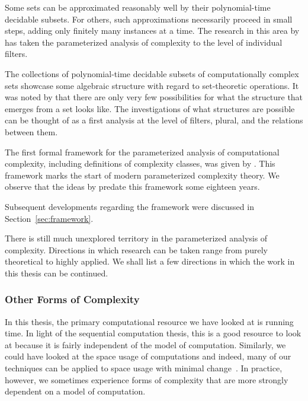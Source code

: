 \begin{description}
  Some sets can be approximated reasonably well by their polynomial-time decidable subsets.
  For others, such approximations necessarily proceed in small steps, adding only finitely many instances at a time.
  The research in this area by \citeauthor{orponen1985polynomial} has taken the parameterized analysis of complexity to the level of individual filters.
\item[\yeartextcite{orponen1986classification}]
  The collections of polynomial-time decidable subsets of computationally complex sets showcase some algebraic structure with regard to set-theoretic operations.
  It was noted by \citeauthor{orponen1986classification} that there are only very few possibilities for what the structure that emerges from a set looks like.
  The investigations of what structures are possible can be thought of as a first analysis at the level of filters, plural, and the relations between them.
\item[\yeartextcite{downey1992fixed}]
  The first formal framework for the parameterized analysis of computational complexity, including definitions of complexity classes, was given by \citeauthor{downey1992fixed}.
  This framework marks the start of modern parameterized complexity theory.
  We observe that the ideas by \citeauthor{flajolet1974sets} predate this framework some eighteen years.
\end{description}
Subsequent developments regarding the framework were discussed in Section~\ref{sec:framework}.


\label{sec:conclusion:future}%

There is still much unexplored territory in the parameterized analysis of complexity.
Directions in which research can be taken range from purely theoretical to highly applied.
We shall list a few directions in which the work in this thesis can be continued.

\subsubsection{Other Forms of Complexity}
In this thesis, the primary computational resource we have looked at is running time.
In light of the sequential computation thesis, this is a good resource to look at because it is fairly independent of the model of computation.
Similarly, we could have looked at the space usage of computations and indeed, many of our techniques can be applied to space usage with minimal change~\parencite{witteveen2015structural}.
In practice, however, we sometimes experience forms of complexity that are more strongly dependent on a model of computation.

